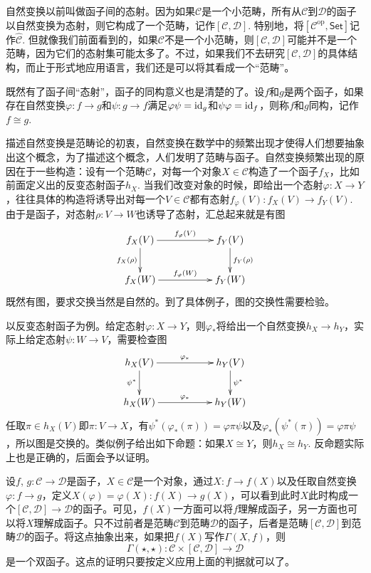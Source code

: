 自然变换以前叫做函子间的态射。因为如果$\mathcal{C}$是一个小范畴，所有从$\mathcal{C}$到$\mathcal{D}$的函子以自然变换为态射，则它构成了一个范畴，记作$[\mathcal{C},\mathcal{D}]$. 特别地，将$[\mathcal{C}^\text{op},\mathsf{Set}]$记作$\hat{\mathcal{C}}$. 但就像我们前面看到的，如果$\mathcal{C}$不是一个小范畴，则$[\mathcal{C},\mathcal{D}]$可能并不是一个范畴，因为它们的态射集可能太多了。不过，如果我们不去研究$[\mathcal{C},\mathcal{D}]$的具体结构，而止于形式地应用语言，我们还是可以将其看成一个“范畴”。

既然有了函子间“态射”，函子的同构意义也是清楚的了。设$f$和$g$是两个函子，如果存在自然变换$\varphi:f\to g$和$\psi:g\to f$满足$\varphi\psi=\operatorname{id}_g$和$\psi\varphi=\operatorname{id}_f$，则称$f$和$g$同构，记作$f\cong g$.

描述自然变换是范畴论的初衷，自然变换在数学中的频繁出现才使得人们想要抽象出这个概念，为了描述这个概念，人们发明了范畴与函子。自然变换频繁出现的原因在于一些构造：设有一个范畴$\mathcal{C}$，对每一个对象$X\in \mathcal{C}$构造了一个函子$f_X$，比如前面定义出的反变态射函子$h_X$. 当我们改变对象的时候，即给出一个态射$\varphi:X\to Y$，往往具体的构造将诱导出对每一个$V\in \mathcal{C}$都有态射$f_\varphi(V):f_X(V)\to f_Y(V)$. 由于是函子，对态射$\rho:V\to W$也诱导了态射，汇总起来就是有图
\[
\begin{xy}
	\xymatrix{
		f_X(V)\ar[rr]^{f_\varphi(V)} \ar[d]_{f_X(\rho)}&&f_Y(V) \ar[d]^{f_Y(\rho)}\\
		f_X(W)\ar[rr]^{f_\varphi(W)}&&f_Y(W)
	}
\end{xy}
\]
既然有图，要求交换当然是自然的。到了具体例子，图的交换性需要检验。

以反变态射函子为例。给定态射$\varphi:X\to Y$，则$\varphi_*$将给出一个自然变换$h_X\to h_Y$，实际上给定态射$\psi:W\to V$，需要检查图
\[
\begin{xy}
	\xymatrix{
		h_X(V)\ar[rr]^{\varphi_*} \ar[d]_{\psi^*}&&h_Y(V) \ar[d]^{\psi^*}\\
		h_X(W)\ar[rr]^{\varphi_*}&&h_Y(W)
	}
\end{xy}
\]
任取$\pi\in h_X(V)$即$\pi:V\to X$，有$\psi^*(\varphi_*(\pi))=\varphi\pi\psi$以及$\varphi_*(\psi^*(\pi))=\varphi\pi\psi$，所以图是交换的。类似例子给出如下命题：如果$X\cong Y$，则$h_X\cong h_Y$. 反命题实际上也是正确的，后面会予以证明。

\para 设$f$, $g:\mathcal{C}\to \mathcal{D}$是函子，$X\in \mathcal{C}$是一个对象，通过$X:f\to f(X)$以及任取自然变换$\varphi:f\to g$，定义$X(\varphi)=\varphi(X):f(X)\to g(X)$，可以看到此时$X$此时构成一个$[\mathcal{C},\mathcal{D}] \to \mathcal{D}$的函子。可见，$f(X)$一方面可以将$f$理解成函子，另一方面也可以将$X$理解成函子。只不过前者是范畴$\mathcal{C}$到范畴$\mathcal{D}$的函子，后者是范畴$[\mathcal{C},\mathcal{D}]$到范畴$\mathcal{D}$的函子。将这点抽象出来，如果把$f(X)$写作$\Gamma(X,f)$，则
\[
	\Gamma(\star,\star):\mathcal{C}\times [\mathcal{C},\mathcal{D}]\to \mathcal{D}
\]
是一个双函子。这点的证明只要按定义应用上面的判据就可以了。

